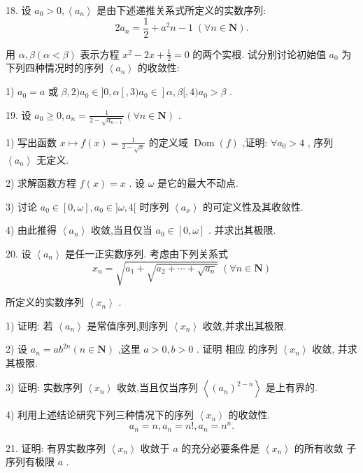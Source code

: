 18. 设 ${a}_{0} > 0,\left\langle  {a}_{n}\right\rangle$ 是由下述递推关系式所定义的实数序列:
$$2{a}_{n} = \frac{1}{2} + {a}^{2}n - 1\;\left( {\forall n \in  \mathbf{N}}\right) .$$

用 $\alpha ,\beta \left( {\alpha  < \beta }\right)$ 表示方程 ${x}^{2} - {2x} + \frac{1}{2} = 0$ 的两个实根. 试分别讨论初始值 ${a}_{0}$ 为下列四种情况时的序列 $\left\langle  {a}_{n}\right\rangle$ 的收敛性:

1) ${a}_{0} = a$ 或 $\beta ,2){a}_{0} \in  \rbrack 0,\alpha \left\lbrack  {,3){a}_{0} \in  }\right\rbrack  \alpha ,\beta \lbrack ,4){a}_{0} > \beta$ .

19. 设 ${a}_{0} \geq  0,{a}_{n} = \frac{1}{2 - \sqrt{{a}_{n - 1}}}\left( {\forall n \in  \mathbf{N}}\right)$ .

1) 写出函数 $x \mapsto  f\left( x\right)  = \frac{1}{2 - \sqrt{x}}$ 的定义域 $\operatorname{Dom}\left( f\right)$ ,证明: $\forall {a}_{0} > 4$ , 序列 $\left\langle  {a}_{n}\right\rangle$ 无定义.

2) 求解函数方程 $f\left( x\right)  = x$ . 设 $\omega$ 是它的最大不动点.

3) 讨论 ${a}_{0} \in  \left\lbrack  {0,\omega }\right\rbrack  ,{a}_{0} \in  \rbrack \omega ,4\lbrack$ 时序列 $\left\langle  {a}_{x}\right\rangle$ 的可定义性及其收敛性.

4) 由此推得 $\left\langle  {a}_{n}\right\rangle$ 收敛,当且仅当 ${a}_{0} \in  \left\lbrack  {0,\omega }\right\rbrack$ . 并求出其极限.

20. 设 $\left\langle  {a}_{n}\right\rangle$ 是任一正实数序列. 考虑由下列关系式
$${x}_{n} = \sqrt{{a}_{1} + \sqrt{{a}_{2} + \cdots  + \sqrt{{a}_{n}}}}\;\left( {\forall n \in  \mathbf{N}}\right)$$

所定义的实数序列 $\left\langle  {x}_{n}\right\rangle$ .

1) 证明: 若 $\left\langle  {a}_{n}\right\rangle$ 是常值序列,则序列 $\left\langle  {x}_{n}\right\rangle$ 收敛,并求出其极限.

2) 设 ${a}_{n} = a{b}^{2n}\left( {n \in  \mathbf{N}}\right)$ ,这里 $a > 0,b > 0$ . 证明 相应 的序列 $\left\langle  {x}_{n}\right\rangle$ 收敛, 并求其极限.

3) 证明: 实数序列 $\left\langle  {x}_{n}\right\rangle$ 收敛,当且仅当序列 $\left\langle  {\left( {a}_{n}\right) }^{2 - n}\right\rangle$ 是上有界的.

4) 利用上述结论研究下列三种情况下的序列 $\left\langle  {x}_{n}\right\rangle$ 的收敛性.
$${a}_{n} = n,{a}_{n} = n!,{a}_{n} = {n}^{n}.$$

21. 证明: 有界实数序列 $\left\langle  {x}_{n}\right\rangle$ 收敛于 $a$ 的充分必要条件是 $\left\langle  {x}_{n}\right\rangle$ 的所有收敛 子序列有极限 $a$ .

